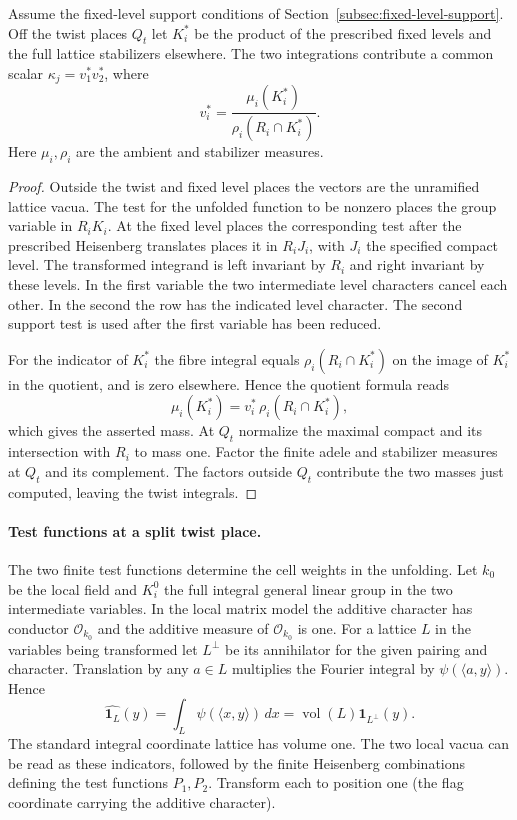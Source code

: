 \begin{lemma}
Assume the fixed-level support conditions of
Section~\ref{subsec:fixed-level-support}. Off the twist places \(Q_t\) let \(K_i^*\) be the product of the
prescribed fixed levels and the full lattice stabilizers elsewhere.
The two integrations contribute a common scalar \(\kappa_j=v_1^*v_2^*\),
where
\[
 v_i^*=\frac{\mu_i(K_i^*)}{\rho_i(R_i\cap K_i^*)}.
\]
Here \(\mu_i,\rho_i\) are the ambient and stabilizer measures.
\end{lemma}
\begin{proof}
Outside the twist and fixed level places the vectors are the unramified lattice vacua.
The test for the unfolded function to be nonzero places the
group variable in \(R_iK_i\). At the fixed level places the
corresponding test after the prescribed Heisenberg translates
places it in \(R_iJ_i\), with \(J_i\) the specified compact
level. The transformed integrand is left invariant by \(R_i\)
and right invariant by these levels. In the first variable the
two intermediate level characters cancel each other. In the
second the row has the indicated level character. The second
support test is used after the first variable has been reduced.

For the indicator of \(K_i^*\) the fibre integral equals
\(\rho_i(R_i\cap K_i^*)\) on the image of \(K_i^*\) in the quotient,
and is zero elsewhere. Hence the quotient formula reads
\[
            \mu_i(K_i^*)=v_i^*\,\rho_i(R_i\cap K_i^*),
\]
which gives the asserted mass. At \(Q_t\) normalize the
maximal compact and its intersection with \(R_i\) to mass one.
Factor the finite adele and stabilizer measures at \(Q_t\) and
its complement. The factors outside \(Q_t\) contribute the two
masses just computed, leaving the twist integrals.
\end{proof}

\paragraph{Test functions at a split twist place.}

The two finite test functions determine the cell weights in the unfolding. Let \(k_0\) be the local field and
\(K_i^0\) the full integral general linear group in the two
intermediate variables. In the local matrix model the additive
character has conductor \(\mathcal O_{k_0}\) and the additive
measure of \(\mathcal O_{k_0}\) is one. For a lattice \(L\) in the variables being transformed let
\(L^\perp\) be its annihilator for the given pairing and character.
Translation by any \(a\in L\) multiplies the Fourier integral by
\(\psi(\langle a,y\rangle)\). Hence
\[
 \widehat{\mathbf1_L}(y)=\int_L\psi(\langle x,y\rangle)\,dx
       =\operatorname{vol}(L)\mathbf1_{L^\perp}(y).
\]
The standard integral coordinate lattice has volume one. The two local vacua can be read as these
indicators, followed by the finite Heisenberg combinations
defining the test functions \(P_1,P_2\). Transform each to
position one (the flag coordinate carrying the additive
character).

